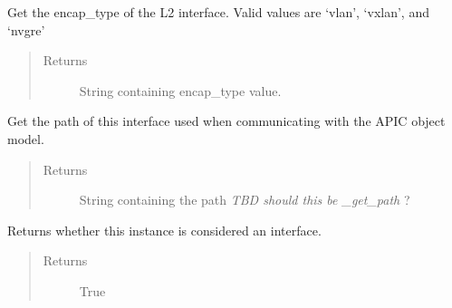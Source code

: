 \documentclass[letterpaper,10pt,english]{sphinxmanual}
\begin{document}
\begin{fulllineitems}

\begin{fulllineitems}
\label{acitoolkit:acitoolkit.L2Interface.get_encap_type}
Get the encap\_type of the L2 interface.
Valid values are `vlan', `vxlan', and `nvgre'
\begin{quote}\begin{description}
\item[{Returns}] \leavevmode
String containing encap\_type value.

\end{description}\end{quote}

\end{fulllineitems}


\begin{fulllineitems}
\label{acitoolkit:acitoolkit.L2Interface.get_path}
Get the path of this interface used when communicating with        the APIC object model.
\begin{quote}\begin{description}
\item[{Returns}] \leavevmode
String containing the path \emph{TBD should this be \_get\_path} ?

\end{description}\end{quote}

\end{fulllineitems}


\begin{fulllineitems}
\label{acitoolkit:acitoolkit.L2Interface.is_interface}
Returns whether this instance is considered an interface.
\begin{quote}\begin{description}
\item[{Returns}] \leavevmode
True

\end{description}\end{quote}

\end{fulllineitems}


\end{fulllineitems}
\end{document}
